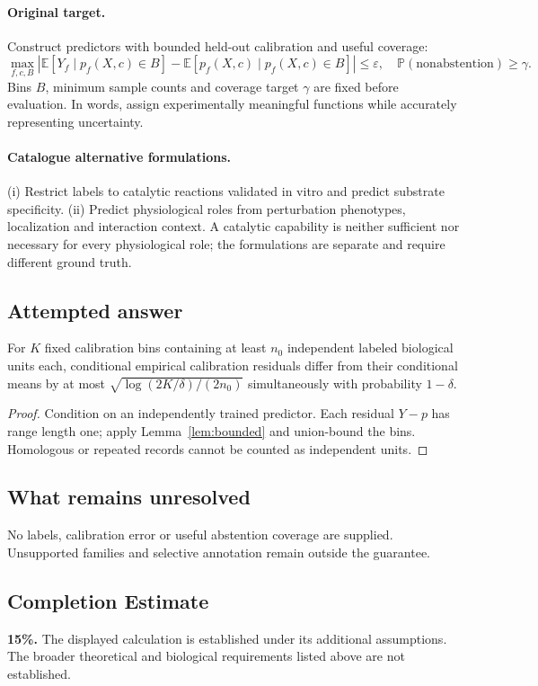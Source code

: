 \documentclass[11pt]{article}
\begin{document}
\paragraph{Original target.}
Construct predictors with bounded held-out calibration and useful coverage:
\[
\max_{f,c,B}\left|\mathbb{E}[Y_f\mid p_f(X,c)\in B]-\mathbb{E}[p_f(X,c)\mid p_f(X,c)\in B]\right|\leq\varepsilon,
\quad \mathbb{P}(\mathrm{nonabstention})\geq\gamma.
\]
Bins $B$, minimum sample counts and coverage target $\gamma$ are fixed before evaluation. In words, assign experimentally meaningful functions while accurately representing uncertainty.
\paragraph{Catalogue alternative formulations.}
(i) Restrict labels to catalytic reactions validated in vitro and predict substrate specificity. (ii) Predict physiological roles from perturbation phenotypes, localization and interaction context. A catalytic capability is neither sufficient nor necessary for every physiological role; the formulations are separate and require different ground truth.
\subsection{Attempted answer}
\begin{proposition}
For $K$ fixed calibration bins containing at least $n_0$ independent labeled biological units each, conditional empirical calibration residuals differ from their conditional means by at most $\sqrt{\log(2K/\delta)/(2n_0)}$ simultaneously with probability $1-\delta$.
\end{proposition}
\begin{proof}
Condition on an independently trained predictor. Each residual $Y-p$ has range length one; apply Lemma~\ref{lem:bounded} and union-bound the bins. Homologous or repeated records cannot be counted as independent units.
\end{proof}
\subsection{What remains unresolved}
No labels, calibration error or useful abstention coverage are supplied. Unsupported families and selective annotation remain outside the guarantee.
\subsection{Completion Estimate}
\textbf{15\%.} The displayed calculation is established under its additional assumptions. The broader theoretical and biological requirements listed above are not established.
\end{document}
